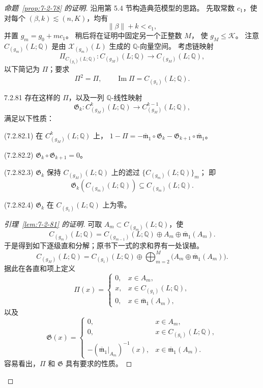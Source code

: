 \begin{proof}[命题~\ref{prop:7-2-78} 的证明]
沿用第 5.4 节构造典范模型的思路。
先取常数 $c_1$，使对每个
$(\beta,k)\lesssim(n,K)$，均有
\begin{equation}
\|\beta\|+k<c_1,
\tag{7.2.80}\label{eq:7-2-80}
\end{equation}
并置 $g_m=g_0+mc_1$。
稍后将在证明中固定另一个正整数 $M$，
使 $g_M\le\mathcal K$。
注意 $C_{(g_m)}(L;\mathbb Q)$ 是由
$\mathcal X_{(g_m)}(L)$ 生成的 $\mathbb Q$-向量空间。
考虑链映射
\[
\Pi_{C_{(g_1)}(L;\mathbb Q)}\colon
C_{(g_M)}(L;\mathbb Q)
\longrightarrow C_{(g_M)}(L;\mathbb Q),
\]
以下简记为 $\Pi$；要求
\[
\Pi^2=\Pi,
\qquad
\operatorname{Im}\Pi=C_{(g_1)}(L;\mathbb Q).
\]

\begin{lemma}{7.2.81}\label{lem:7-2-81}
存在这样的 $\Pi$，以及一列 $\mathbb Q$-线性映射
\[
\mathfrak G_k\colon
C^k_{(g_M)}(L;\mathbb Q)
\longrightarrow C^{k-1}_{(g_M)}(L;\mathbb Q),
\]
满足以下性质：

\noindent\textup{(7.2.82.1)}\quad
在 $C^k_{(g_M)}(L;\mathbb Q)$ 上，
$1-\Pi=-\overline{\mathfrak m}_1\circ\mathfrak G_k
-\mathfrak G_{k+1}\circ\overline{\mathfrak m}_1$。

\noindent\textup{(7.2.82.2)}\quad
$\mathfrak G_k\circ\mathfrak G_{k+1}=0$。

\noindent\textup{(7.2.82.3)}\quad
$\mathfrak G_k$ 保持
$C_{(g_M)}(L;\mathbb Q)$ 上的滤过
$\{C_{(g_m)}(L;\mathbb Q)\}_m$；
即
\[
\mathfrak G_k(C_{(g_m)}(L;\mathbb Q))
\subseteq C_{(g_m)}(L;\mathbb Q).
\]

\noindent\textup{(7.2.82.4)}\quad
$\mathfrak G_k$ 在
$C_{(g_1)}(L;\mathbb Q)$ 上为零。
\end{lemma}

\begin{proof}[引理~\ref{lem:7-2-81} 的证明]
可取 $A_m\subset C_{(g_m)}(L;\mathbb Q)$，使
\[
C_{(g_m)}(L;\mathbb Q)
=C_{(g_{m-1})}(L;\mathbb Q)
\oplus A_m\oplus\overline{\mathfrak m}_1(A_m).
\]
于是得到如下逐级直和分解；原书下一式的求和界有一处误植。%
\[
C_{(g_M)}(L;\mathbb Q)
=C_{(g_1)}(L;\mathbb Q)
\oplus\bigoplus_{m=2}^{M}
\bigl(A_m\oplus\overline{\mathfrak m}_1(A_m)\bigr).
\]
据此在各直和项上定义
\[
\Pi(x)=
\begin{cases}
0,&x\in A_m,\\
x,&x\in C_{(g_1)}(L;\mathbb Q),\\
0,&x\in\overline{\mathfrak m}_1(A_m),
\end{cases}
\]
以及
\[
\mathfrak G(x)=
\begin{cases}
0,&x\in A_m,\\
0,&x\in C_{(g_1)}(L;\mathbb Q),\\
-(\overline{\mathfrak m}_1|_{A_m})^{-1}(x),
  &x\in\overline{\mathfrak m}_1(A_m).
\end{cases}
\]
容易看出，$\Pi$ 和 $\mathfrak G$
具有要求的性质。
\end{proof}


\end{proof}
